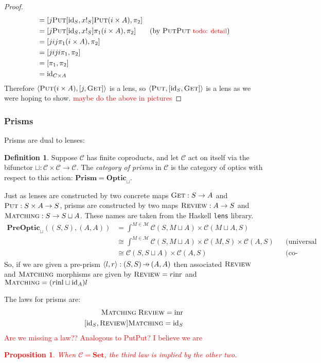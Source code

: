 \documentclass[11pt,a4paper]{article}
\theoremstyle{plain}
\newtheorem{proposition}[theorem]{Proposition}
\theoremstyle{definition}
\newtheorem{definition}[theorem]{Definition}
\newcommand{\C}{\mathscr{C}}
\newcommand{\M}{\mathscr{M}}
\newcommand{\Set}{\mathbf{Set}}
\newcommand{\PreOptic}{\mathbf{PreOptic}}
\newcommand{\Optic}{\mathbf{Optic}}
\newcommand{\Prism}{\mathbf{Prism}}
\newcommand{\id}{\mathrm{id}}
\newcommand{\inl}{\mathrm{inl}}
\newcommand{\inr}{\mathrm{inr}}
\newcommand{\fget}{\textsc{Get}}
\newcommand{\fput}{\textsc{Put}}
\newcommand{\freview}{\textsc{Review}}
\newcommand{\fmatching}{\textsc{Matching}}
\newcommand{\hto}{\ensuremath{\,\mathaccent\shortmid\rightarrow\,}}
\newcommand{\todo}[1]{\textcolor{red}{\small #1}}
\begin{document}
\begin{proof}
\begin{align*}
&= [j\fput [\id_S,x !_S] \fput (i \times A), \pi_2] && \\
&= [j\fput [\id_S, x !_S] \pi_1 (i \times A), \pi_2] && \text{(by $\fput\fput$ \todo{todo: detail})}\\
&= [jij \pi_1 (i \times A), \pi_2] && \\
&= [jiji \pi_1, \pi_2] && \\
&= [\pi_1, \pi_2] && \\
&= \id_{C \times A}
\end{align*}
Therefore $\langle \fput (i \times A), [j,\fget] \rangle$ is a lens, so  $\langle \fput, [\id_S, \fget] \rangle$ is a lens as we were hoping to show. \todo{maybe do the above in pictures}
\end{proof}

\subsubsection{Prisms}
Prisms are dual to lenses:

\begin{definition}
Suppose $\C$ has finite coproducts, and let $\C$ act on itself via the bifunctor $\sqcup : \C \times \C \to \C$. The \emph{category of prisms} in $\C$ is the category of optics with respect to this action: $\Prism = \Optic_\sqcup$.
\end{definition}

Just as lenses are constructed by two concrete maps $\fget : S \to A$ and $\fput : S \times A \to S$, prisms are constructed by two maps $\freview : A \to S$ and $\fmatching : S \to S \sqcup A$. These names are taken from the Haskell \texttt{lens} library.
\begin{align*}
\PreOptic_\sqcup((S, S), (A, A)) &= \int^{M \in \M} \C(S, M \sqcup A) \times \C(M \sqcup A, S) \\
&\cong \int^{M \in \M} \C(S, M \sqcup A) \times \C(M, S) \times \C(A, S) && \text{(universal property of coproduct)} \\
&\cong \C(S, S \sqcup A) \times \C(A, S) && \text{(co-Yoneda)}
\end{align*}
So, if we are given a pre-prism $\langle l, r \rangle : (S, S) \hto (A, A)$ then associated $\freview$ and $\fmatching$ morphisms are given by $\freview = r \inr$ and $\fmatching = (r\inl \sqcup \id_A)l$

The laws for prisms are:
\begin{align*}
\fmatching \; \freview = \inr \\
[\id_S, \freview] \fmatching = \id_S
\end{align*}
\todo{Are we missing a law?? Analogous to PutPut? I believe we are}
\todo{
\begin{proposition}
When $\C = \Set$, the third law is implied by the other two.
\end{proposition}
}
\end{document}
